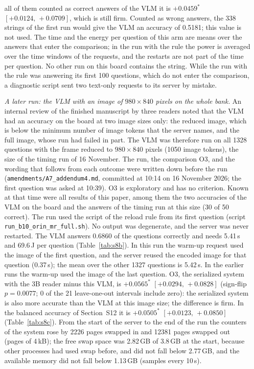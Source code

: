 \documentclass[10pt]{article}
\begin{document}
all of them counted as correct answers of the VLM it is $+0.0459^{*}$ $[+0.0124,\,+0.0709]$, which is still firm. Counted as wrong answers, the 338 strings of the first run would give the VLM an accuracy of 0.5181; this value is not used. The time and the energy per question of this arm are means over the answers that enter the comparison; in the run with the rule the power is averaged over the time windows of the requests, and the restarts are not part of the time per question. No other run on this board contains the string. While the run with the rule was answering its first 100 questions, which do not enter the comparison, a diagnostic script sent two text-only requests to its server by mistake.

\emph{A later run: the VLM with an image of $980\times840$ pixels on the whole bank.} An internal review of the finished manuscript by three readers noted that the VLM had an accuracy on the board at two image sizes only: the reduced image, which is below the minimum number of image tokens that the server names, and the full image, whose run had failed in part. The VLM was therefore run on all 1328 questions with the frame reduced to $980\times840$ pixels (1050 image tokens), the size of the timing run of 16 November. The run, the comparison O3, and the wording that follows from each outcome were written down before the run (\texttt{amendments/A7\_addendum4.md}, committed at 10:14 on 16 November 2026; the first question was asked at 10:39). O3 is exploratory and has no criterion. Known at that time were all results of this paper, among them the two accuracies of the VLM on the board and the answers of the timing run at this size (30 of 50 correct). The run used the script of the reload rule from its first question (script \texttt{run\_b10\_orin\_mr\_full.sh}). No output was degenerate, and the server was never restarted. The VLM answers 0.6860 of the questions correctly and needs 5.41\,s and 69.6\,J per question (Table~\ref{tab:s8b}). In this run the warm-up request used the image of the first question, and the server reused the encoded image for that question (0.37\,s); the mean over the other 1327 questions is 5.42\,s. In the earlier runs the warm-up used the image of the last question. O3, the serialized system with the 3B reader minus this VLM, is $+0.0565^{*}$ $[+0.0294,\,+0.0828]$ (sign-flip $p=0.0077$; 0 of the 21 leave-one-out intervals include zero): the serialized system is also more accurate than the VLM at this image size; the difference is firm. In the balanced accuracy of Section~S12 it is $+0.0505^{*}$ $[+0.0123,\,+0.0850]$ (Table~\ref{tab:s8c}). From the start of the server to the end of the run the counters of the system rose by 2226 pages swapped in and 12381 pages swapped out (pages of 4\,kB); the free swap space was 2.82\,GB of 3.8\,GB at the start, because other processes had used swap before, and did not fall below 2.77\,GB, and the available memory did not fall below 1.13\,GB (samples every 10\,s).
\end{document}
